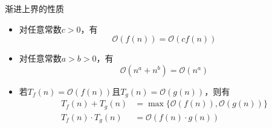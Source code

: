\begin{frame}{\insertsubsectionhead}
	\begin{exampleblock}{渐进上界的性质}
		\begin{itemize}
			\item 对任意常数$c>0$，有
			      \[
				      \mathcal{O}(f(n))=\mathcal{O}(cf(n))
			      \]
			\item 对任意常数$a>b>0$，有
			      \[
				      \mathcal{O}(n^{a}+n^{b})=\mathcal{O}(n^{a})
			      \]
			\item 若$T_{f}(n)=\mathcal{O}(f(n))$且$T_{g}(n)=\mathcal{O}(g(n))$，则有
			      \begin{align*}
				      T_{f}(n)+T_{g}(n)       & =\max\{\mathcal{O}(f(n)),\mathcal{O}(g(n))\} \\
				      T_{f}(n)\cdot{}T_{g}(n) & =\mathcal{O}(f(n)\cdot{}g(n))
			      \end{align*}
		\end{itemize}
	\end{exampleblock}
\end{frame}

